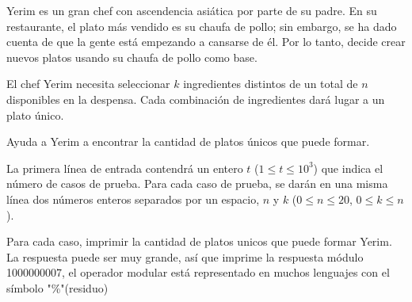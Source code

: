 
Yerim es un gran chef con ascendencia asiática por parte de su padre. En su restaurante, el plato más vendido es su chaufa de pollo; sin embargo, se ha dado cuenta de que la gente está empezando a cansarse de él. Por lo tanto, decide crear nuevos platos usando su chaufa de pollo como base.

El chef Yerim necesita seleccionar $k$ ingredientes distintos de un total de $n$ disponibles en la despensa. Cada combinación de ingredientes dará lugar a un plato único.

Ayuda a Yerim a encontrar la cantidad de platos únicos que puede formar.



La primera línea de entrada contendrá un entero $t$ ($1\leq t \leq 10^3$) que indica el número de casos de prueba. Para cada caso de prueba, se darán en una misma línea dos números enteros separados por un espacio, $n$ y $k$ ($0 \leq n \leq 20$, $0 \leq k \leq n$).

\outputText

Para cada caso, imprimir la cantidad de platos unicos que puede formar Yerim.\\
La respuesta puede ser muy grande, así que imprime la respuesta módulo 1000000007, el operador modular está representado en muchos lenguajes con el símbolo "\%"(residuo)

\exampleCases

\begin{example}
\end{example}


